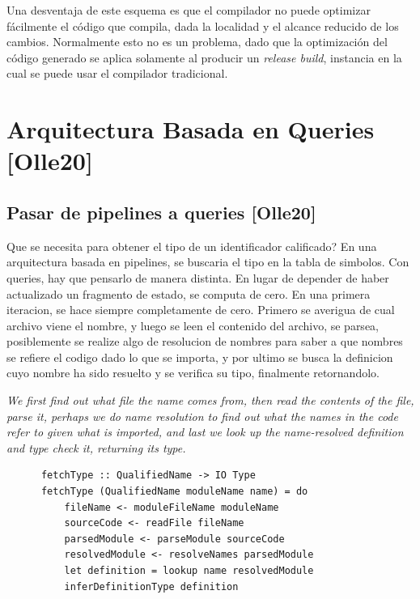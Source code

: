 \documentclass[12pt, a4paper]{report}
\begin{document}
    Una desventaja de este esquema es que el compilador no puede optimizar fácilmente el código que compila, dada la localidad y el alcance reducido de los cambios.
    Normalmente esto no es un problema, dado que la optimización del código generado se aplica solamente al producir un \textit{release build}, instancia en la cual se puede usar el compilador tradicional.
    \cite{wiki_incremental_compiler}

  \section*{Arquitectura Basada en Queries [Olle20]}

    \subsection*{Pasar de pipelines a queries [Olle20]}

      Que se necesita para obtener el tipo de un identificador calificado?
      En una arquitectura basada en pipelines, se buscaria el tipo en la tabla de simbolos.
      Con queries, hay que pensarlo de manera distinta.
      En lugar de depender de haber actualizado un fragmento de estado, se computa de cero.
      En una primera iteracion, se hace siempre completamente de cero.
      Primero se averigua de cual archivo viene el nombre, y luego se leen el contenido del archivo, se parsea, posiblemente se realize algo de resolucion de nombres para saber a que nombres se refiere el codigo dado lo que se importa, y por ultimo se busca la definicion cuyo nombre ha sido resuelto y se verifica su tipo, finalmente retornandolo.

      \textit{We first find out what file the name comes from, then read the contents of the file, parse it, perhaps we do name resolution to find out what the names in the code refer to given what is imported, and last we look up the name-resolved definition and type check it, returning its type.}

      \begin{verbatim}
      fetchType :: QualifiedName -> IO Type
      fetchType (QualifiedName moduleName name) = do
          fileName <- moduleFileName moduleName
          sourceCode <- readFile fileName
          parsedModule <- parseModule sourceCode
          resolvedModule <- resolveNames parsedModule
          let definition = lookup name resolvedModule
          inferDefinitionType definition
      \end{verbatim}
\end{document}
